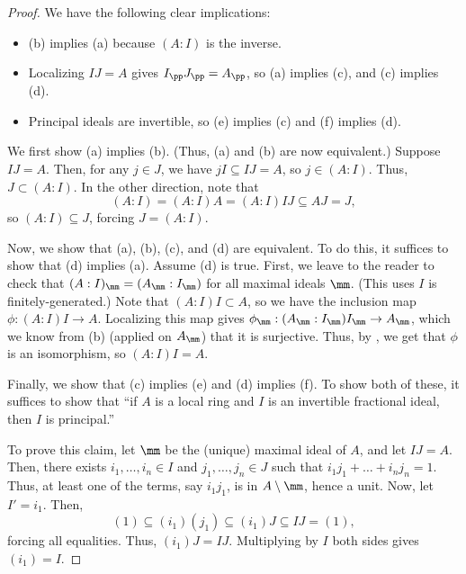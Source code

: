 \begin{proof}
    We have the following clear implications:
    \begin{itemize}
    \item (b) implies (a) because $(A:I)$ is the inverse.
    \item Localizing $IJ=A$ gives $I_\pp J_\pp = A_\pp$,
    so (a) implies (c), and (c) implies (d).
    \item Principal ideals are invertible, so 
    (e) implies (c) and (f) implies (d).
    \end{itemize}
    We first show (a) implies (b).
    (Thus, (a) and (b) are now equivalent.)
    Suppose $IJ=A$.
    Then, for any $j\in J$, we have $jI \subseteq IJ = A$,
    so $j\in (A:I)$. Thus, $J\subset (A:I)$. 
    In the other direction, note that
    $$(A:I) = (A:I)A = (A:I)IJ \subseteq AJ = J,$$
    so $(A:I)\subseteq J$, forcing $J=(A:I)$.
    
    Now, we show that (a), (b), (c), and (d) are equivalent.
    To do this, it suffices to show that (d) implies (a).
    Assume (d) is true.
    First, we leave to the reader to check that
    $(A:I)_\mm = (A_\mm : I_\mm)$ for all maximal ideals $\mm$.
    (This uses $I$ is finitely-generated.)
    Note that $(A:I)I \subset A$, so we have the inclusion map
    $\phi : (A:I)I \to A$. Localizing this map gives
    $\phi_\mm : (A_\mm : I_\mm)I_\mm \to A_\mm$,
    which we know from (b) (applied on $A_\mm$)
    that it is surjective. 
    Thus, by ,
    we get that $\phi$ is an isomorphism,
    so $(A:I)I = A$.

    Finally, we show that (c) implies (e) and (d) implies (f).
    To show both of these, it suffices to show that
    ``if $A$ is a local ring and 
    $I$ is an invertible fractional ideal, then
    $I$ is principal.''

    To prove this claim, let $\mm$ be the (unique) 
    maximal ideal of $A$, and let $IJ=A$.
    Then, there exists $i_1,\dots,i_n\in I$
    and $j_1,\dots,j_n\in J$ such that 
    $i_1j_1 + \dots + i_nj_n = 1$.
    Thus, at least one of the terms, say $i_1j_1$,
    is in $A\setminus \mm$, hence a unit.
    Now, let $I'=i_1$. Then,
    $$(1) \subseteq (i_1)(j_1) \subseteq (i_1)J
    \subseteq IJ = (1),$$
    forcing all equalities. Thus, $(i_1)J = IJ$.
    Multiplying by $I$ both sides gives $(i_1)=I$.
\end{proof}
